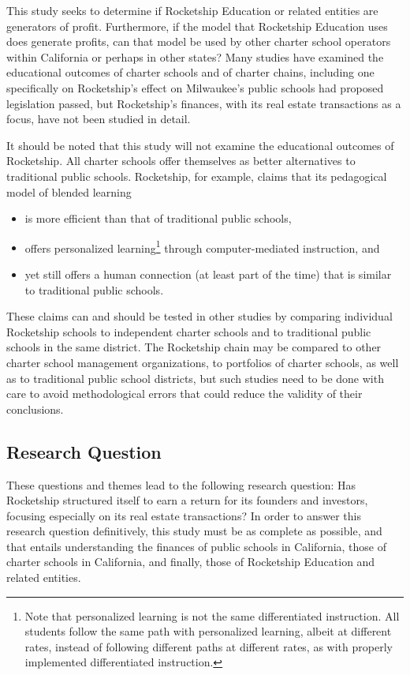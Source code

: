 This study seeks to determine if Rocketship Education or related entities are generators of profit. Furthermore, if the model that Rocketship Education uses does generate profits, can that model be used by other charter school operators within California or perhaps in other states? Many studies have examined the educational outcomes of charter schools and of charter chains, including one specifically on Rocketship's effect on Milwaukee's public schools had proposed legislation passed, but Rocketship's finances, with its real estate transactions as a focus, have not been studied in detail.

It should be noted that this study will not examine the educational outcomes of Rocketship. All charter schools offer themselves as better alternatives to traditional public schools. Rocketship, for example, claims that its pedagogical model of blended learning
\begin{itemize}
  \item is more efficient than that of traditional public schools,
  \item offers personalized learning\footnote{Note that personalized learning is not the same differentiated instruction. All students follow the same path with personalized learning, albeit at different rates, instead of following different paths at different rates, as with properly implemented differentiated instruction.} through computer-mediated instruction, and
  \item yet still offers a human connection (at least part of the time) that is similar to traditional public schools.
\end{itemize}
These claims can and should be tested in other studies by comparing individual Rocketship schools to independent charter schools and to traditional public schools in the same district. The Rocketship chain may be compared to other charter school management organizations, to portfolios of charter schools, as well as to traditional public school districts, but such studies need to be done with care to avoid methodological errors that could reduce the validity of their conclusions.

\subsection{Research Question}\label{sec:research-questions}\indent

These questions and themes lead to the following research question: Has Rocketship structured itself to earn a return for its founders and investors, focusing especially on its real estate transactions? In order to answer this research question definitively, this study must be as complete as possible, and that entails understanding the finances of public schools in California, those of charter schools in California, and finally, those of Rocketship Education and related entities.

